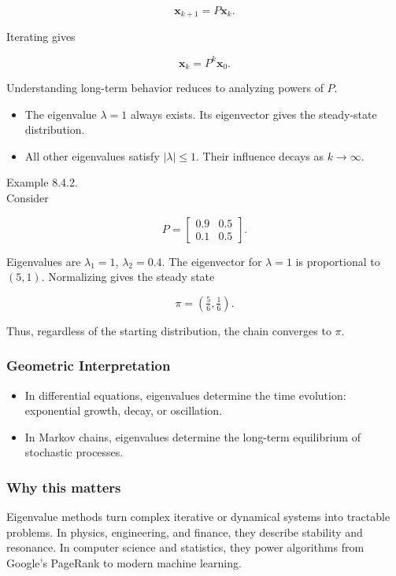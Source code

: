 \documentclass[
  12pt,
  a4paper,
]{article}
\begin{document}
\[\mathbf{x}_{k+1} = P \mathbf{x}_k.\]

Iterating gives

\[\mathbf{x}_k = P^k \mathbf{x}_0.\]

Understanding long-term behavior reduces to analyzing powers of \(P\).

\begin{itemize}
\item
  The eigenvalue \(\lambda = 1\) always exists. Its eigenvector gives
  the steady-state distribution.
\item
  All other eigenvalues satisfy \(|\lambda| \leq 1\). Their influence
  decays as \(k \to \infty\).
\end{itemize}

Example 8.4.2.\\
Consider

\[P = \begin{bmatrix} 0.9 & 0.5 \\ 0.1 & 0.5 \end{bmatrix}.\]

Eigenvalues are \(\lambda_1 = 1\), \(\lambda_2 = 0.4\). The eigenvector
for \(\lambda = 1\) is proportional to \((5,1)\). Normalizing gives the
steady state

\[\pi = \left(\tfrac{5}{6}, \tfrac{1}{6}\right).\]

Thus, regardless of the starting distribution, the chain converges to
\(\pi\).

\subsubsection{Geometric
Interpretation}\label{geometric-interpretation-19}

\begin{itemize}
\item
  In differential equations, eigenvalues determine the time evolution:
  exponential growth, decay, or oscillation.
\item
  In Markov chains, eigenvalues determine the long-term equilibrium of
  stochastic processes.
\end{itemize}

\subsubsection{Why this matters}\label{why-this-matters-31}

Eigenvalue methods turn complex iterative or dynamical systems into
tractable problems. In physics, engineering, and finance, they describe
stability and resonance. In computer science and statistics, they power
algorithms from Google's PageRank to modern machine learning.
\end{document}
